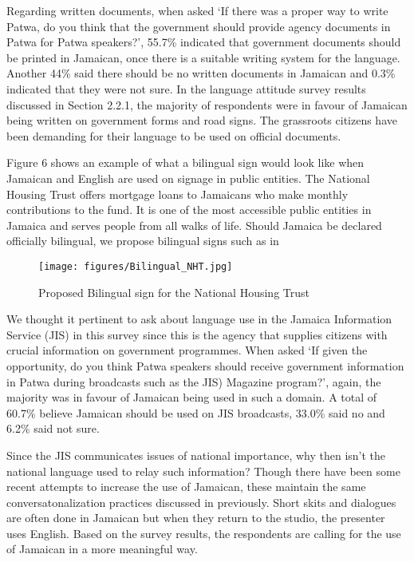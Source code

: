 \documentclass[output=paper,colorlinks,citecolor=brown]{langscibook}
\begin{document}
Regarding written documents, when asked ‘If there was a proper way to write Patwa, do you think that the government should provide agency documents in Patwa for Patwa speakers?’, 55.7\% indicated that government documents should be printed in Jamaican, once there is a suitable writing system for the language. Another 44\% said there should be no written documents in Jamaican and 0.3\% indicated that they were not sure. In the language attitude survey results discussed in Section 2.2.1, the majority of respondents were in favour of Jamaican being written on government forms and road signs. The grassroots citizens have been demanding for their language to be used on official documents. 

Figure 6 shows an example of what a bilingual sign would look like when Jamaican and English are used on signage in public entities. The National Housing Trust offers mortgage loans to Jamaicans who make monthly contributions to the fund. It is one of the most accessible public entities in Jamaica and serves people from all walks of life. Should Jamaica be declared officially bilingual, we propose bilingual signs such as in 

\begin{figure}
    \centering
    \texttt{[image: figures/Bilingual\_NHT.jpg]}
    \caption{Proposed Bilingual sign for the National Housing Trust}
    \label{fig:Bilingual_NHT}
\end{figure}

We thought it pertinent to ask about language use in the Jamaica Information Service (JIS) in this survey since this is the agency that supplies citizens with crucial information on government programmes. When asked ‘If given the opportunity, do you think Patwa speakers should receive government information in Patwa during broadcasts such as the JIS) Magazine program?’, again, the majority was in favour of Jamaican being used in such a domain. A total of 60.7\% believe Jamaican should be used on JIS broadcasts, 33.0\% said no and 6.2\% said not sure. 

Since the JIS communicates issues of national importance, why then isn’t the national language used to relay such information? Though there have been some recent attempts to increase the use of Jamaican, these maintain the same conversatonalization practices discussed in previously. Short skits and dialogues are often done in Jamaican but when they return to the studio, the presenter uses English. Based on the survey results, the respondents are calling for the use of Jamaican in a more meaningful way.
\end{document}

